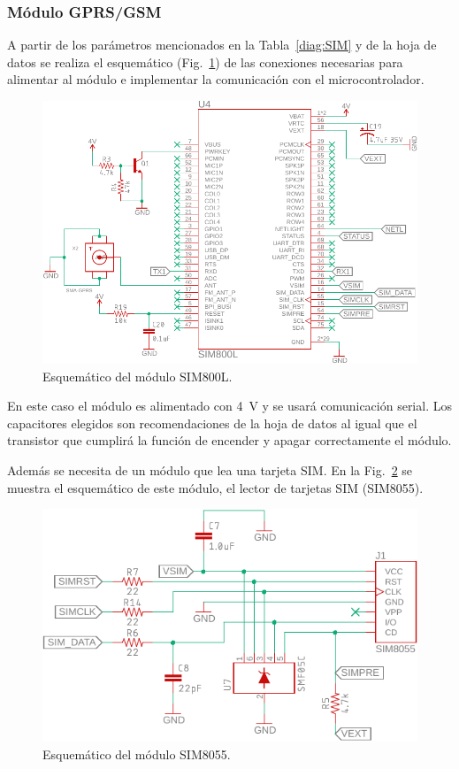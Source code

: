 \subsubsection{Módulo GPRS/GSM}
A partir de los parámetros mencionados en la Tabla~\ref{diag:SIM} y de la hoja de datos \cite{SIM800L} se realiza el esquemático (Fig.~\ref{fig:GSM_esquem}) de las conexiones necesarias para alimentar al módulo e implementar la comunicación con el microcontrolador.

\begin{figure}[htb!]
\centering
\includegraphics[width=\textwidth]{GSM_esquem.pdf}
\caption{Esquemático del módulo SIM800L.}
\label{fig:GSM_esquem}
\end{figure}

En este caso el módulo es alimentado con \SI{4}{V} y se usará comunicación serial. Los capacitores elegidos son recomendaciones de la hoja de datos \cite{SIM800L} al igual que el transistor que cumplirá la función de encender y apagar correctamente el módulo.

Además se necesita de un módulo que lea una tarjeta SIM. En la Fig.~\ref{fig:GSM_SIM_esquem} se muestra el esquemático de este módulo, el lector de tarjetas SIM (SIM8055).

\begin{figure}[htbp!]
\centering
\includegraphics[width=\textwidth]{GSM_SIM_esquem.pdf}
\caption{Esquemático del módulo SIM8055.}
\label{fig:GSM_SIM_esquem}
\end{figure}

